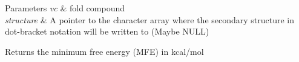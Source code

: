 \begin{DoxyParams}{Parameters}
{\em vc} & fold compound \\
\hline
{\em structure} & A pointer to the character array where the secondary structure in dot-\/bracket notation will be written to (Maybe N\+U\+L\+L)\\
\hline
\end{DoxyParams}
\begin{DoxyReturn}{Returns}
the minimum free energy (M\+F\+E) in kcal/mol 
\end{DoxyReturn}
